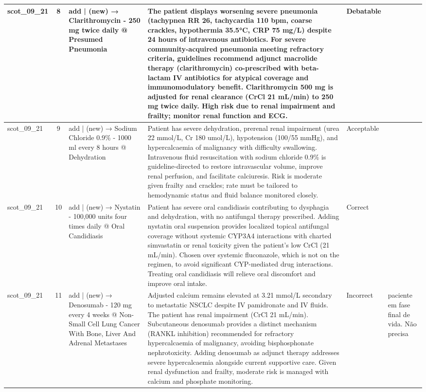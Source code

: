 \begin{longtable}{|p{1.45cm}|c|p{3.3cm}|p{6.5cm}|p{1.55cm}|p{2.3cm}|}
\hline
scot\_09\_21 & 8 & add | (new) → Clarithromycin - 250 mg twice daily @ Presumed Pneumonia & The patient displays worsening severe pneumonia (tachypnea RR 26, tachycardia 110 bpm, coarse crackles, hypothermia 35.5°C, CRP 75 mg/L) despite 24 hours of intravenous antibiotics. For severe community-acquired pneumonia meeting refractory criteria, guidelines recommend adjunct macrolide therapy (clarithromycin) co-prescribed with beta-lactam IV antibiotics for atypical coverage and immunomodulatory benefit. Clarithromycin 500 mg is adjusted for renal clearance (CrCl 21 mL/min) to 250 mg twice daily. High risk due to renal impairment and frailty; monitor renal function and ECG. & Debatable &  \\
\hline
scot\_09\_21 & 9 & add | (new) → Sodium Chloride 0.9\% - 1000 ml every 8 hours @ Dehydration & Patient has severe dehydration, prerenal renal impairment (urea 22 mmol/L, Cr 180 umol/L), hypotension (100/55 mmHg), and hypercalcaemia of malignancy with difficulty swallowing. Intravenous fluid resuscitation with sodium chloride 0.9\% is guideline-directed to restore intravascular volume, improve renal perfusion, and facilitate calciuresis. Risk is moderate given frailty and crackles; rate must be tailored to hemodynamic status and fluid balance monitored closely. & Acceptable &  \\
\hline
scot\_09\_21 & 10 & add | (new) → Nystatin - 100,000 units four times daily @ Oral Candidiasis & Patient has severe oral candidiasis contributing to dysphagia and dehydration, with no antifungal therapy prescribed. Adding nystatin oral suspension provides localized topical antifungal coverage without systemic CYP3A4 interactions with charted simvastatin or renal toxicity given the patient's low CrCl (21 mL/min). Chosen over systemic fluconazole, which is not on the regimen, to avoid significant CYP-mediated drug interactions. Treating oral candidiasis will relieve oral discomfort and improve oral intake. & Correct &  \\
\hline
scot\_09\_21 & 11 & add | (new) → Denosumab - 120 mg every 4 weeks @ Non-Small Cell Lung Cancer With Bone, Liver And Adrenal Metastases & Adjusted calcium remains elevated at 3.21 mmol/L secondary to metastatic NSCLC despite IV pamidronate and IV fluids. The patient has renal impairment (CrCl 21 mL/min). Subcutaneous denosumab provides a distinct mechanism (RANKL inhibition) recommended for refractory hypercalcaemia of malignancy, avoiding bisphosphonate nephrotoxicity. Adding denosumab as adjunct therapy addresses severe hypercalcaemia alongside current supportive care. Given renal dysfunction and frailty, moderate risk is managed with calcium and phosphate monitoring. & Incorrect & paciente em fase final de vida. Não precisa \\

\end{longtable}
